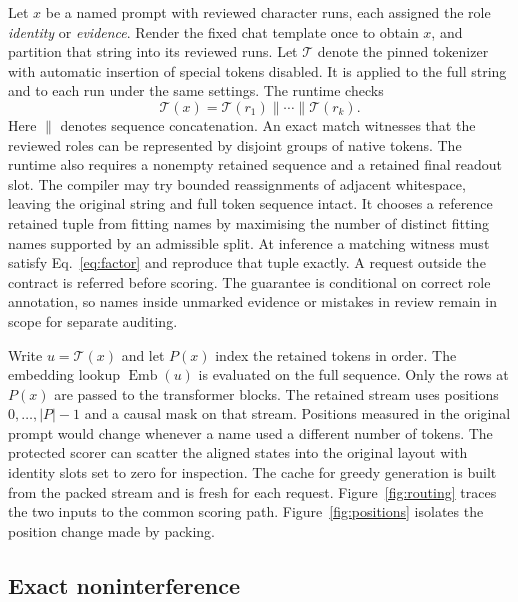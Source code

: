 \documentclass[11pt,a4paper]{article}
\newcommand{\T}{\mathcal{T}}
\newcommand{\E}{\operatorname{Emb}}
\begin{document}
Let \(x\) be a named prompt with reviewed character runs, each assigned the role \emph{identity} or \emph{evidence}. Render the fixed chat template once to obtain \(x\), and partition that string into its reviewed runs. Let \(\T\) denote the pinned tokenizer with automatic insertion of special tokens disabled. It is applied to the full string and to each run under the same settings. The runtime checks
\begin{equation}
 \T(x)=\T(r_1)\mathbin{\|}\cdots\mathbin{\|}\T(r_k).
 \label{eq:factor}
\end{equation}
Here \(\|\) denotes sequence concatenation. An exact match witnesses that the reviewed roles can be represented by disjoint groups of native tokens. The runtime also requires a nonempty retained sequence and a retained final readout slot. The compiler may try bounded reassignments of adjacent whitespace, leaving the original string and full token sequence intact. It chooses a reference retained tuple from fitting names by maximising the number of distinct fitting names supported by an admissible split. At inference a matching witness must satisfy Eq.~\ref{eq:factor} and reproduce that tuple exactly. A request outside the contract is referred before scoring. The guarantee is conditional on correct role annotation, so names inside unmarked evidence or mistakes in review remain in scope for separate auditing.

Write \(u=\T(x)\) and let \(P(x)\) index the retained tokens in order. The embedding lookup \(\E(u)\) is evaluated on the full sequence. Only the rows at \(P(x)\) are passed to the transformer blocks. The retained stream uses positions \(0,\ldots,|P|-1\) and a causal mask on that stream. Positions measured in the original prompt would change whenever a name used a different number of tokens. The protected scorer can scatter the aligned states into the original layout with identity slots set to zero for inspection. The cache for greedy generation is built from the packed stream and is fresh for each request. Figure~\ref{fig:routing} traces the two inputs to the common scoring path. Figure~\ref{fig:positions} isolates the position change made by packing.




\subsection{Exact noninterference}
\end{document}
